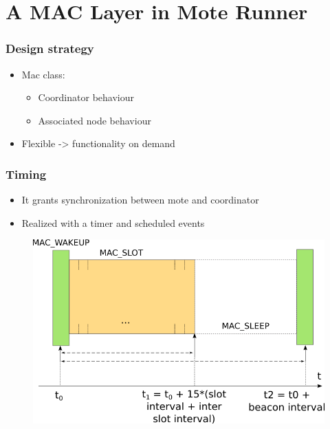 \section{A MAC Layer in Mote Runner}
\begin{frame}[fragile]
  \frametitle{Design strategy}
  \begin{itemize}
    \item Mac class:
    \begin{itemize}
      \item Coordinator behaviour
      \item Associated node behaviour
    \end{itemize}
    \item Flexible -> functionality on demand
  \end{itemize}

\end{frame}

\begin{frame}[fragile]
  \frametitle{Timing}
  \begin{itemize}
    \item It grants synchronization between mote and coordinator
    \item Realized with a timer and scheduled events
  \end{itemize}
  \begin{figure}
    \centering
    \includegraphics[width=.7\textwidth]{img/MAC_STATES.png}
  \end{figure}

\end{frame}

